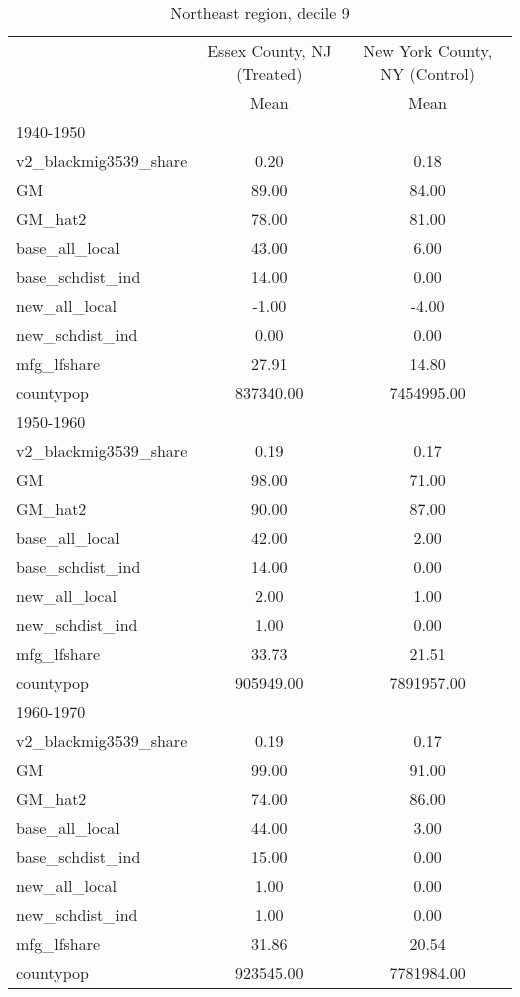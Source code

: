 \begin{table}[htbp]\centering
\def\sym#1{\ifmmode^{#1}\else\(^{#1}\)\fi}
\caption{Northeast region, decile 9 \label{tab1}}
\begin{tabular}{l*{2}{c}}
\toprule
                    &\multicolumn{1}{c}{Essex County, NJ (Treated)}&\multicolumn{1}{c}{New York County, NY (Control)}\\
                    &        Mean&        Mean\\
\midrule
1940-1950           &            &            \\
v2\_blackmig3539\_share&        0.20&        0.18\\
GM                  &       89.00&       84.00\\
GM\_hat2             &       78.00&       81.00\\
base\_all\_local      &       43.00&        6.00\\
base\_schdist\_ind    &       14.00&        0.00\\
new\_all\_local       &       -1.00&       -4.00\\
new\_schdist\_ind     &        0.00&        0.00\\
mfg\_lfshare         &       27.91&       14.80\\
countypop           &   837340.00&  7454995.00\\
\midrule
1950-1960           &            &            \\
v2\_blackmig3539\_share&        0.19&        0.17\\
GM                  &       98.00&       71.00\\
GM\_hat2             &       90.00&       87.00\\
base\_all\_local      &       42.00&        2.00\\
base\_schdist\_ind    &       14.00&        0.00\\
new\_all\_local       &        2.00&        1.00\\
new\_schdist\_ind     &        1.00&        0.00\\
mfg\_lfshare         &       33.73&       21.51\\
countypop           &   905949.00&  7891957.00\\
\midrule
1960-1970           &            &            \\
v2\_blackmig3539\_share&        0.19&        0.17\\
GM                  &       99.00&       91.00\\
GM\_hat2             &       74.00&       86.00\\
base\_all\_local      &       44.00&        3.00\\
base\_schdist\_ind    &       15.00&        0.00\\
new\_all\_local       &        1.00&        0.00\\
new\_schdist\_ind     &        1.00&        0.00\\
mfg\_lfshare         &       31.86&       20.54\\
countypop           &   923545.00&  7781984.00\\
\bottomrule
\end{tabular}
\end{table}
